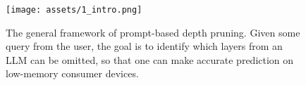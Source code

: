 \begin{figure}[t] %
\centering
\texttt{[image: assets/1\_intro.png]} %
\caption{The general framework of prompt-based depth pruning. Given some query from the user, the goal is to identify which layers from an LLM can be omitted, so that one can make accurate prediction on low-memory consumer devices.}\label{fig:intro}%
\end{figure}

